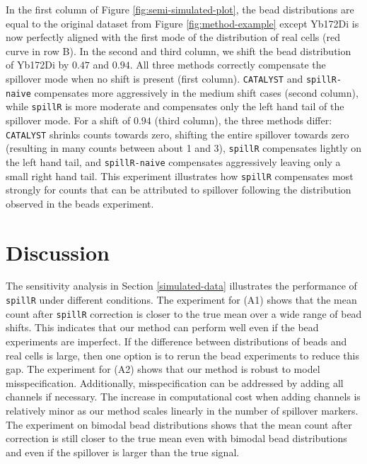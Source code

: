 \documentclass{bioinfo}
\begin{document}
In the first column of Figure \ref{fig:semi-simulated-plot}, the bead
distributions are equal to the original dataset from Figure
\ref{fig:method-example} except Yb172Di is now perfectly aligned with
the first mode of the distribution of real cells (red curve in row B).
In the second and third column, we shift the bead distribution of
Yb172Di by \(0.47\) and \(0.94\). All three methods correctly compensate
the spillover mode when no shift is present (first column).
\texttt{CATALYST} and \texttt{spillR-naive} compensates more
aggressively in the medium shift cases (second column), while
\texttt{spillR} is more moderate and compensates only the left hand tail
of the spillover mode. For a shift of \(0.94\) (third column), the three
methods differ: \texttt{CATALYST} shrinks counts towards zero, shifting
the entire spillover towards zero (resulting in many counts between
about 1 and 3), \texttt{spillR} compensates lightly on the left hand
tail, and \texttt{spillR-naive} compensates aggressively leaving only a
small right hand tail. This experiment illustrates how \texttt{spillR}
compensates most strongly for counts that can be attributed to spillover
following the distribution observed in the beads experiment.

\section{Discussion}

\label{discussion}

The sensitivity analysis in Section \ref{simulated-data} illustrates the
performance of \texttt{spillR} under different conditions. The
experiment for (A1) shows that the mean count after \texttt{spillR}
correction is closer to the true mean over a wide range of bead shifts.
This indicates that our method can perform well even if the bead
experiments are imperfect. If the difference between distributions of
beads and real cells is large, then one option is to rerun the bead
experiments to reduce this gap. The experiment for (A2) shows that our
method is robust to model misspecification. Additionally,
misspecification can be addressed by adding all channels if necessary.
The increase in computational cost when adding channels is relatively
minor as our method scales linearly in the number of spillover markers.
The experiment on bimodal bead distributions shows that the mean count
after correction is still closer to the true mean even with bimodal bead
distributions and even if the spillover is larger than the true signal.
\end{document}
